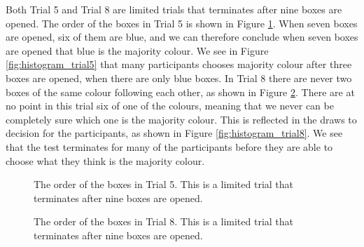 Both Trial 5 and Trial 8 are limited trials that terminates after nine boxes are opened. The order of the boxes in Trial 5 is shown in Figure \ref{fig:trial5_order}. When seven boxes are opened, six of them are blue, and we can therefore conclude when seven boxes are opened that blue is the majority colour. We see in Figure \ref{fig:histogram_trial5} that many participants chooses majority colour after three boxes are opened, when there are only blue boxes. In Trial 8 there are never two boxes of the same colour following each other, as shown in Figure \ref{fig:trial8_order}. There are at no point in this trial six of one of the colours, meaning that we never can be completely sure which one is the majority colour. This is reflected in the draws to decision for the participants, as shown in Figure \ref{fig:histogram_trial8}. We see that the test terminates for many of the participants before they are able to choose what they think is the majority colour. 
\begin{figure}
    \centering
    \scalebox{0.8}{}
    \caption[Order of Boxes in Trial 5]{The order of the boxes in Trial 5. This is a limited trial that terminates after nine boxes are opened.}
    \label{fig:trial5_order}
\end{figure}
\begin{figure}
    \centering
    \scalebox{0.8}{}
    \caption[Order of Boxes in Trial 8]{The order of the boxes in Trial 8. This is a limited trial that terminates after nine boxes are opened.}
    \label{fig:trial8_order}
\end{figure}

